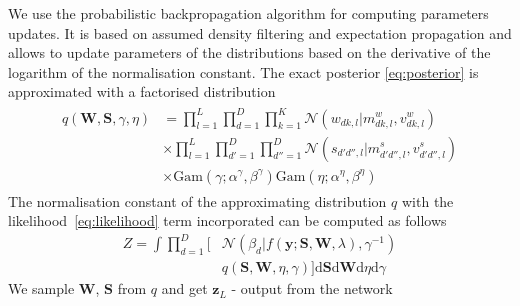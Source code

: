 \documentclass[letterpaper]{article}
\begin{document}
We use the probabilistic backpropagation algorithm \cite{hernandez2015probabilistic} for computing parameters updates. It is based on assumed density filtering and expectation propagation and allows to update parameters of the distributions based on the derivative of the logarithm of the normalisation constant. 
The exact posterior \ref{eq:posterior} is approximated with a factorised distribution
\begin{align}
\begin{split}
q(\mathbf{W}, \mathbf{S}, \gamma, \eta) &= \prod_{l=1}^L\prod_{d=1}^D\prod_{k=1}^K \mathcal{N}(w_{dk, l} | m^w_{dk, l}, v^w_{dk, l}) \\
&\times \prod_{l=1}^L\prod_{d'=1}^D\prod_{d''=1}^D \mathcal{N}(s_{d'd'', l} | m^s_{d'd'', l}, v^s_{d'd'', l}) \\
&\times \text{Gam}(\gamma; \alpha^\gamma, \beta^\gamma) \text{Gam}(\eta; \alpha^\eta, \beta^\eta) 
\end{split}
\end{align}
The normalisation constant of the approximating distribution $q$ with the likelihood~\ref{eq:likelihood} term incorporated can be computed as follows
\begin{align}
Z = \int \prod_{d=1}^{D} \big[&\mathcal{N}(\beta_d | f(\mathbf{y} ; \mathbf{S}, \mathbf{W}, \lambda), \gamma^{-1}) \\
 &q(\mathbf{S}, \mathbf{W}, \eta, \gamma)\big] \mathrm{d}\mathbf{S} \mathrm{d}\mathbf{W} \mathrm{d}\eta \mathrm{d}\gamma
\end{align}
We sample $\mathbf{W}$, $\mathbf{S}$ from $q$ and get $\mathbf{z}_L$ - output from the network
\end{document}
